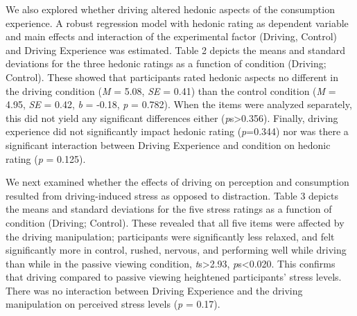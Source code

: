 \documentclass[authordate, empirical]{jote-new-article}
\begin{document}
We also explored whether driving altered hedonic aspects of the consumption experience. A robust regression model with hedonic rating as dependent variable and main effects and interaction of the experimental factor (Driving, Control) and Driving Experience was estimated. Table 2 depicts the means and standard deviations for the three hedonic ratings as a function of condition (Driving; Control). These showed that participants rated hedonic aspects no different in the driving condition (\emph{M} = 5.08, \emph{SE} = 0.41) than the control condition (\emph{M }= 4.95, \emph{SE }= 0.42, \emph{b }= -0.18, \emph{p }= 0.782). When the items were analyzed separately, this did not yield any significant differences either (\emph{p}s>0.356). Finally, driving experience did not significantly impact hedonic rating (\emph{p}=0.344) nor was there a significant interaction between Driving Experience and condition on hedonic rating (\emph{p }= 0.125).



We next examined whether the effects of driving on perception and consumption resulted from driving-induced stress as opposed to distraction. Table 3 depicts the means and standard deviations for the five stress ratings as a function of condition (Driving; Control). These revealed that all five items were affected by the driving manipulation; participants were significantly less relaxed, and felt significantly more in control, rushed, nervous, and performing well while driving than while in the passive viewing condition, \emph{t}s>2.93, \emph{p}s<0.020. This confirms that driving compared to passive viewing heightened participants’ stress levels. There was no interaction between Driving Experience and the driving manipulation on perceived stress levels (\emph{p }= 0.17).
\end{document}
